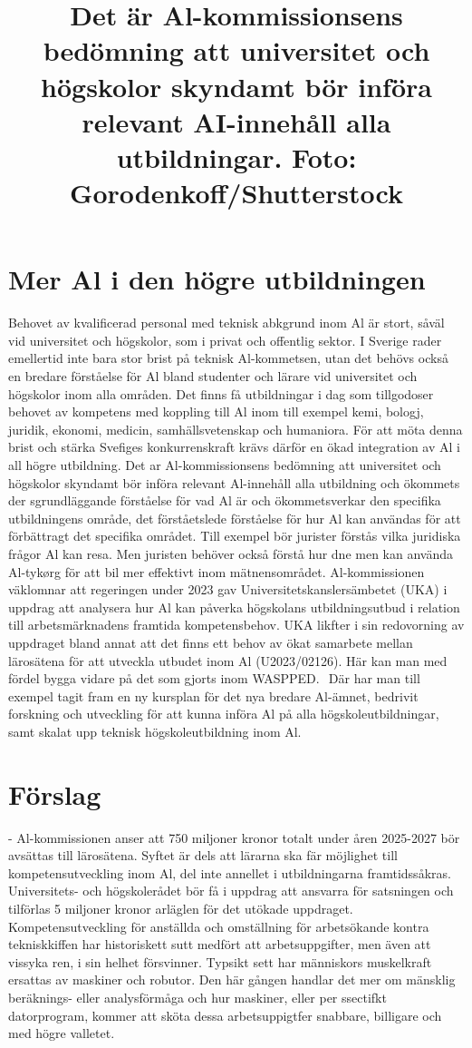 \title{
Det är Al-kommissionsens bedömning att universitet och högskolor skyndamt bör införa relevant AI-innehåll alla utbildningar. Foto: Gorodenkoff/Shutterstock
}
\section*{Mer Al i den högre utbildningen}
Behovet av kvalificerad personal med teknisk abkgrund inom Al är stort, såväl vid universitet och högskolor, som i privat och offentlig sektor. I Sverige rader emellertid inte bara stor brist på teknisk Al-kommetsen, utan det behövs också en bredare förståelse för Al bland studenter och lärare vid universitet och högskolor inom alla områden. Det finns få utbildningar i dag som tillgodoser behovet av kompetens med koppling till Al inom till exempel kemi, bologj, juridik, ekonomi, medicin, samhällsvetenskap och humaniora. För att möta denna brist och stärka Svefiges konkurrenskraft krävs därför en ökad integration av Al i all högre utbildning.
Det ar Al-kommissionsens bedömning att universitet och högskolor skyndamt bör införa relevant Al-innehåll alla utbildning och ökommets der sgrundläggande förståelse för vad Al är och ökommetsverkar den specifika utbildningens område, det förståetslede förståelse för hur Al kan användas för att förbättragt det specifika området. Till exempel bör jurister förstås vilka juridiska frågor Al kan resa. Men juristen behöver också förstå hur dne men kan använda Al-tykørg för att bil mer effektivt inom mätnensområdet.
Al-kommissionen väklomnar att regeringen under 2023 gav Universitetskanslersämbetet (UKA) i uppdrag att analysera hur Al kan påverka högskolans utbildningsutbud i relation till arbetsmärknadens framtida kompetensbehov. UKA likfter i sin redovorning av uppdraget bland annat att det finns ett behov av ökat samarbete mellan lärosätena för att utveckla utbudet inom Al (U2023/02126). Här kan man med fördel bygga vidare på det som gjorts inom WASPPED. \({ }^{}\) Där har man till exempel tagit fram en ny kursplan för det nya bredare Al-ämnet, bedrivit forskning och utveckling för att kunna införa Al på alla högskoleutbildningar, samt skalat upp teknisk högskoleutbildning inom Al.
\section*{Förslag}
- Al-kommissionen anser att 750 miljoner kronor totalt under åren 2025-2027 bör avsättas till lärosätena. Syftet är dels att lärarna ska fär möjlighet till kompetensutveckling inom Al, del inte annellet i utbildningarna framtidssåkras. Universitets- och högskolerådet bör få i uppdrag att ansvarra för satsningen och tilförlas 5 miljoner kronor arläglen för det utökade uppdraget.
Kompetensutveckling för anställda och omställning för arbetsökande kontra tekniskkiffen har historiskett sutt medfört att arbetsuppgifter, men även att vissyka ren, i sin helhet försvinner. Typsikt sett har människors muskelkraft ersattas av maskiner och robutor. Den här gången handlar det mer om mänsklig beräknings- eller analysförmåga och hur maskiner, eller per ssectifkt datorprogram, kommer att sköta dessa arbetsuppigtfer snabbare, billigare och med högre valletet.

